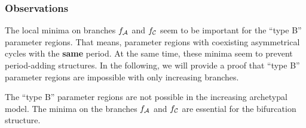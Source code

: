 \subsubsection{Observations}

The local minima on branches $f_{\mathcal{A}}$ and $f_{\mathcal{C}}$ seem to be important for the ``type B'' parameter regions.
That means, parameter regions with coexisting asymmetrical cycles with the \textbf{same} period.
At the same time, these minima seem to prevent period-adding structures.
In the following, we will provide a proof that ``type B'' parameter regions are impossible with only increasing branches.

\begin{theorem}
	The ``type B'' parameter regions are not possible in the increasing archetypal model.
	The minima on the branches $f_{\mathcal{A}}$ and $f_{\mathcal{C}}$ are essential for the bifurcation structure.
\end{theorem}

